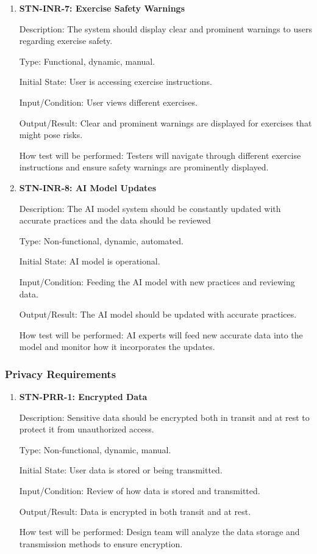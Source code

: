 \documentclass[12pt, titlepage]{article}
\begin{document}
\begin{enumerate}
\item{\textbf{STN-INR-7: Exercise Safety Warnings}}

Description: The system should display clear and prominent warnings to users regarding exercise safety.

Type: Functional, dynamic, manual.

Initial State: User is accessing exercise instructions.

Input/Condition: User views different exercises.

Output/Result: Clear and prominent warnings are displayed for exercises that might pose risks.

How test will be performed: Testers will navigate through different exercise instructions and ensure safety warnings are prominently displayed.


\item{\textbf{STN-INR-8: AI Model Updates}}

Description: The AI model system should be constantly updated with accurate practices and the data should be reviewed

Type: Non-functional, dynamic, automated.

Initial State: AI model is operational.

Input/Condition: Feeding the AI model with new practices and reviewing data.

Output/Result: The AI model should be updated with accurate practices.

How test will be performed: AI experts will feed new accurate data into the model and monitor how it incorporates the updates.

\end{enumerate}


\subsubsection{Privacy Requirements}

\begin{enumerate}
\item {\textbf{STN-PRR-1: Encrypted Data}}

Description: Sensitive data should be encrypted both in transit and at rest to protect it from unauthorized access.

Type: Non-functional, dynamic, manual.

Initial State: User data is stored or being transmitted.

Input/Condition: Review of how data is stored and transmitted.

Output/Result: Data is encrypted in both transit and at rest.

How test will be performed: Design team will analyze the data storage and transmission methods to ensure encryption.

\end{enumerate}
\end{document}
